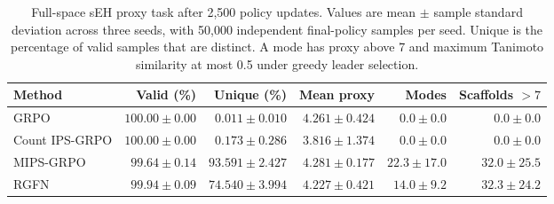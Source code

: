 \begin{table}[htbp]
\centering
\footnotesize
\setlength{\tabcolsep}{3.5pt}
\caption{Full-space sEH proxy task after 2,500 policy updates. Values are mean
\(\pm\) sample standard deviation across three seeds, with 50,000 independent
final-policy samples per seed. Unique is the percentage of valid samples that
are distinct. A mode has proxy above 7 and maximum Tanimoto similarity at most
0.5 under greedy leader selection.}
\label{tab:molecule-main}
\begin{tabular}{lrrrrr}
\toprule
Method & Valid (\%) & Unique (\%) & Mean proxy & Modes & Scaffolds $>7$ \\
\midrule
GRPO & $100.00\pm0.00$ & $0.011\pm0.010$ & $4.261\pm0.424$ & $0.0\pm0.0$ & $0.0\pm0.0$ \\
Count IPS-GRPO & $100.00\pm0.00$ & $0.173\pm0.286$ & $3.816\pm1.374$ & $0.0\pm0.0$ & $0.0\pm0.0$ \\
MIPS-GRPO & $99.64\pm0.14$ & $\mathbf{93.591\pm2.427}$ & $4.281\pm0.177$ & $\mathbf{22.3\pm17.0}$ & $32.0\pm25.5$ \\
RGFN & $99.94\pm0.09$ & $74.540\pm3.994$ & $4.227\pm0.421$ & $14.0\pm9.2$ & $32.3\pm24.2$ \\
\bottomrule
\end{tabular}
\end{table}
